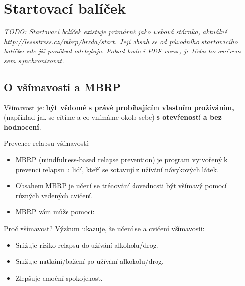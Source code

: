 	

\bgroup
	\cleardoublepage
	\setcounter{section}{-1}
	\titleformat{\section}[frame]{}{}{1em}{\Large\scshape\bfseries}
	\section{Startovací balíček}
\egroup	

\emph{TODO: Startovací balíček existuje primárně jako webová stárnka, aktuálně \url{http://lessstress.cz/mbrp/brzda/start}. Její obsah se od původního startovacího balíčku zde již poněkud odchyluje. Pokud bude i PDF verze, je třeba ho směrem sem synchronizovat.}

\subsection{O všímavosti a MBRP}
	Všímavost je: \textbf{být vědomě s právě probíhajícím vlastním prožíváním,} (například jak se cítíme a co vnímáme okolo sebe) \textbf{s otevřeností a bez hodnocení}.

	Prevence relapsu všímavostí:
	\begin{itemize}
		\item MBRP (mindfulness-based relapse prevention) je program vytvořený k prevenci relapsu u lidí, kteří se zotavují z užívání návykových látek.
		\item Obsahem MBRP je učení se trénování dovednosti být všímavý pomocí různých vedených cvičení.
		\item MBRP vám může pomoci:
	\end{itemize}
	Proč všímavost? Výzkum ukazuje, že učení se a cvičení všímavosti:
	\begin{itemize}
		\item[\mbrpIcon{trend-down}] Snižuje riziko relapsu do užívání alkoholu/drog.
		\item[\mbrpIcon{trend-down}] Snižuje nutkání/bažení po užívání alkoholu/drog.
		\item[\mbrpIcon{trend-up}] Zlepšuje emoční spokojenost.
	\end{itemize}
